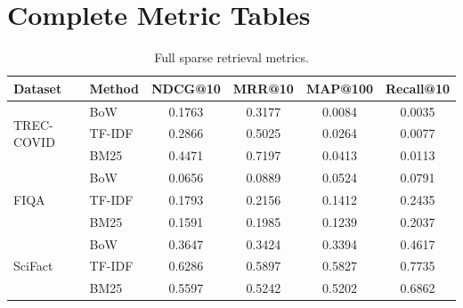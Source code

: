 \documentclass[12pt, a4paper]{article}
\makeatletter
\newcommand{\ndcg}{NDCG@10}
\newcommand{\mrr}{MRR@10}
\newcommand{\map}{MAP@100}
\newcommand{\tc}{TREC-COVID}
\newcommand{\fiqa}{FIQA}
\newcommand{\scifact}{SciFact}
\makeatother
\begin{document}
\appendix

\section{Complete Metric Tables}
\label{app:full_tables}

\begin{table}[h]
\centering
\caption{Full sparse retrieval metrics.}
\label{tab:sparse_full}
\begin{tabular}{llcccc}
\toprule
\textbf{Dataset} & \textbf{Method} & \textbf{\ndcg{}} & \textbf{\mrr{}} & \textbf{\map{}} & \textbf{Recall@10} \\
\midrule
\multirow{3}{*}{\tc{}}
  & BoW    & 0.1763 & 0.3177 & 0.0084 & 0.0035 \\
  & TF-IDF & 0.2866 & 0.5025 & 0.0264 & 0.0077 \\
  & BM25   & 0.4471 & 0.7197 & 0.0413 & 0.0113 \\
\midrule
\multirow{3}{*}{\fiqa{}}
  & BoW    & 0.0656 & 0.0889 & 0.0524 & 0.0791 \\
  & TF-IDF & 0.1793 & 0.2156 & 0.1412 & 0.2435 \\
  & BM25   & 0.1591 & 0.1985 & 0.1239 & 0.2037 \\
\midrule
\multirow{3}{*}{\scifact{}}
  & BoW    & 0.3647 & 0.3424 & 0.3394 & 0.4617 \\
  & TF-IDF & 0.6286 & 0.5897 & 0.5827 & 0.7735 \\
  & BM25   & 0.5597 & 0.5242 & 0.5202 & 0.6862 \\
\bottomrule
\end{tabular}
\end{table}
\end{document}
